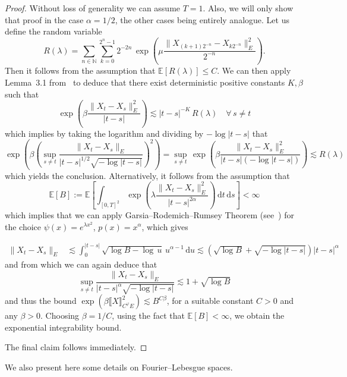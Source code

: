 \documentclass[10pt]{article}
\newcommand{\assign}{:=}
\newcommand{\mathd}{\mathrm{d}}
\begin{document}
\begin{proof}
  Without loss of generality we can assume $T = 1$. Also, we will only show
  that proof in the case $\alpha = 1 / 2$, the other cases being entirely
  analogue. Let us define the random variable
  \[ R (\lambda) = \sum_{n \in \mathbb{N}} \sum_{k = 0}^{2^n - 1} 2^{- 2 n} \,
     \exp \left( \mu \frac{\| X_{(k + 1) 2^{- n}} - X_{k 2^{- n}} \|^2_E}{2^{-
     n}} \right) . \]
  Then it follows from the assumption that $\mathbb{E} [R (\lambda)] \leqslant
  C$. We can then apply Lemma~3.1 from~{\cite{catelliergubinelli}} to deduce
  that there exist deterministic positive constants $K, \beta$ such that
  \[ \exp \left( \beta \frac{\| X_t - X_s \|^2_E}{| t - s |} \right) \lesssim
     | t - s |^{- K} \, R (\lambda) \quad \forall \, s \neq t \]
  which implies by taking the logarithm and dividing by $- \log | t - s |$
  that
  \[ \exp \left( \beta \left( \sup_{s \neq t} \frac{\| X_t - X_s \|_E}{| t - s
     |^{1 / 2} \sqrt{- \log | t - s |}} \right)^2 \right) = \sup_{s \neq t} \,
     \exp \left( \beta \frac{\| X_t - X_s \|^2_E}{| t - s | (- \log | t - s
     |)} \right) \lesssim R (\lambda) \]
  which yields the conclusion. Alternatively, it follows from the assumption
  that
  \[ \mathbb{E} [B] \assign \mathbb{E} \left[ \int_{[0, T]^2} \exp \left(
     \lambda \frac{\| X_t - X_s \|^2_E}{| t - s |^{2 \alpha}} \right) \,
     \mathd t \, \mathd s \right] < \infty \]
  which implies that we can apply Garsia--Rodemich--Rumsey Theorem
  (see~{\cite{garsia}}) for the choice $\psi (x) = e^{\lambda x^2}$, $p (x) =
  x^{\alpha}$, which gives
  
  \begin{align}
    \| X_t - X_s \|_E & \lesssim \int_0^{| t - s |} \sqrt{\log B - \log \, u} \,
    u^{\alpha - 1} \, \mathd u \lesssim \left( \sqrt{\log B} + \sqrt{- \log | t - s
    |} \right) | t - s |^{\alpha} \nonumber
  \end{align}
%  
  and from which we can again deduce that
  \[ \sup_{s \neq t} \frac{\| X_t - X_s \|_E}{| t - s |^{\alpha} \sqrt{- \log
     | t - s |}} \lesssim 1 + \sqrt{\log B} \]
  and thus the bound $\exp( \beta \llbracket X\rrbracket_{C^\varphi E}^2) \lesssim B^{C \beta}$, for a suitable constant $C>0$ and any $\beta>0$. Choosing $\beta=1/C$, using the fact that $\mathbb{E}[B]<\infty$, we obtain the exponential integrability bound.
  
  The final claim follows
  immediately.
\end{proof}

We also present here some details on Fourier--Lebesgue spaces.
\end{document}
